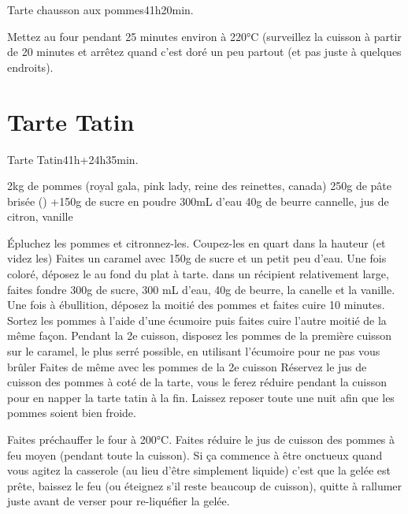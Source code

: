 {\begin{recette}{Tarte chausson aux pommes}{4}{1h}{20min.}
\begin{cuisson}
Mettez au four pendant 25 minutes environ à 220°C (surveillez la cuisson à partir de 20 minutes et arrêtez quand c'est doré un peu partout (et pas juste à quelques endroits).
\end{cuisson}
\end{recette}

\section{Tarte Tatin}
\begin{recette}{Tarte Tatin}{4}{1h+24h}{35min.}
\begin{ingredients}
\ingredient 2kg de pommes (royal gala, pink lady, reine des reinettes, canada)
\ingredient 250g de pâte brisée ()
+150g de sucre en poudre
\ingredient 300mL d'eau
\ingredient 40g de beurre
\ingredient cannelle, jus de citron, vanille
\end{ingredients}

\begin{preparation}
\etape Épluchez les pommes et citronnez-les.
\etape Coupez-les en quart dans la hauteur (et videz les)
\etape Faites un caramel avec 150g de sucre et un petit peu d'eau. Une fois coloré, déposez le au fond du plat à tarte. 
\etape dans un récipient relativement large, faites fondre 300g de sucre, 300 mL d'eau, 40g de beurre, la canelle et la 
vanille. 
\etape Une fois à ébullition, déposez la moitié des pommes et faites cuire 10 minutes. 
\etape Sortez les pommes à l'aide d'une écumoire puis faites 
cuire l'autre moitié de la même façon. Pendant la 2e cuisson, disposez les pommes de la première cuisson sur le caramel, le plus serré possible, en utilisant l'écumoire pour ne pas vous brûler
\etape Faites de même avec les pommes de la 2e cuisson
\etape Réservez le jus de cuisson des pommes à coté de la tarte, vous le ferez réduire pendant la cuisson pour en napper la 
tarte tatin à la fin.
\etape Laissez reposer toute une nuit afin que les pommes soient bien froide.
\end{preparation}

\begin{cuisson}
Faites préchauffer le four à 200°C. Faites réduire le jus de cuisson des pommes à feu moyen (pendant toute la cuisson). Si ça 
commence à être onctueux quand vous agitez la casserole (au lieu d'être simplement liquide) c'est que la gelée est prête, 
baissez le feu (ou éteignez s'il reste beaucoup de cuisson), quitte à rallumer juste avant de verser pour re-liquéfier la gelée.


\end{cuisson}
\end{recette}}
